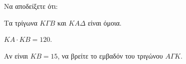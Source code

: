 \begin{alist}
\item Να αποδείξετε ότι:
    \begin{rlist}
    \item Τα τρίγωνα $K\Gamma B$ και $KA\Delta$ είναι όμοια. 
    \item $KA \cdot KB = 120$. 
    \end{rlist}
\item Αν είναι $KB=15$, να βρείτε το εμβαδόν του τριγώνου $A\Gamma K$. 
\end{alist}